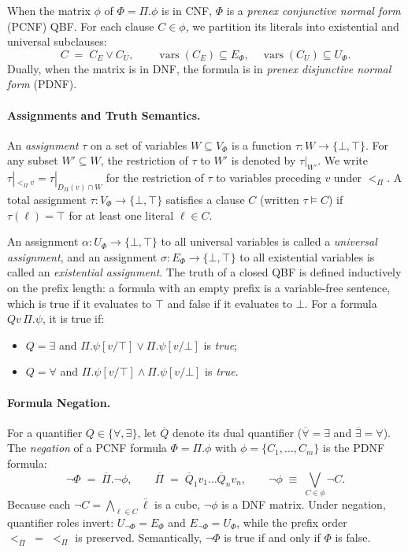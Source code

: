 \documentclass[runningheads]{llncs}
\DeclareMathOperator{\vars}{vars}
\newcommand{\Bool}{\{\bot,\top\}}
\begin{document}
When the matrix $\phi$ of $\Phi = \Pi.\phi$ is in CNF, $\Phi$ is a \emph{prenex conjunctive normal form} (PCNF) QBF.
For each clause $C \in \phi$, we partition its literals into existential and universal subclauses:
\begin{equation}
    C \;=\; C_E \lor C_U , \qquad \vars(C_E) \subseteq E_\Phi, \quad \vars(C_U) \subseteq U_\Phi .
\end{equation}
Dually, when the matrix is in DNF, the formula is in \emph{prenex disjunctive normal form} (PDNF).

\paragraph*{Assignments and Truth Semantics.}
An \emph{assignment} $\tau$ on a set of variables $W \subseteq V_\Phi$ is a function $\tau : W \to \Bool$.
For any subset $W' \subseteq W$, the restriction of $\tau$ to $W'$ is denoted by $\tau|_{W'}$.
We write $\tau|_{<_\Pi v} = \tau|_{D_\Pi(v) \cap W}$ for the restriction of $\tau$ to variables preceding $v$ under $<_\Pi$.
A total assignment $\tau : V_\Phi \to \Bool$ satisfies a clause $C$ (written $\tau \models C$) if $\tau(\ell) = \top$ for at least one literal $\ell \in C$.

An assignment $\alpha : U_\Phi \to \Bool$ to all universal variables is called a \emph{universal assignment}, and an assignment $\sigma : E_\Phi \to \Bool$ to all existential variables is called an \emph{existential assignment}.
The truth of a closed QBF is defined inductively on the prefix length:
a formula with an empty prefix is a variable-free sentence, which is true if it evaluates to $\top$ and false if it evaluates to $\bot$.
For a formula $Q v \, \Pi.\psi$, it is true if:
\begin{itemize}
    \item $Q = \exists$ and $\Pi.\psi[v / \top] \lor \Pi.\psi[v / \bot]$ is \emph{true};
    \item $Q = \forall$ and $\Pi.\psi[v / \top] \land \Pi.\psi[v / \bot]$ is \emph{true}.
\end{itemize}


\paragraph*{Formula Negation.}
For a quantifier $Q \in \{\forall, \exists\}$, let $\overline{Q}$ denote its dual quantifier ($\overline{\forall} = \exists$ and $\overline{\exists} = \forall$).
The \emph{negation} of a PCNF formula $\Phi = \Pi.\phi$ with $\phi = \{C_1, \dots, C_m\}$ is the PDNF formula:
\begin{equation}
    \neg\Phi \;=\; \overline{\Pi}.\neg\phi ,
    \qquad \overline{\Pi} \;=\; \overline{Q}_1 v_1 \dots \overline{Q}_n v_n ,
    \qquad \neg\phi \;\equiv\; \bigvee_{C \in \phi} \neg C .
\end{equation}
Because each $\neg C = \bigwedge_{\ell \in C} \bar{\ell}$ is a cube, $\neg\phi$ is a DNF matrix.
Under negation, quantifier roles invert: $U_{\neg\Phi} = E_\Phi$ and $E_{\neg\Phi} = U_\Phi$, while the prefix order $<_{\overline{\Pi}} \;=\; <_\Pi$ is preserved.
Semantically, $\neg\Phi$ is true if and only if $\Phi$ is false.
\end{document}
